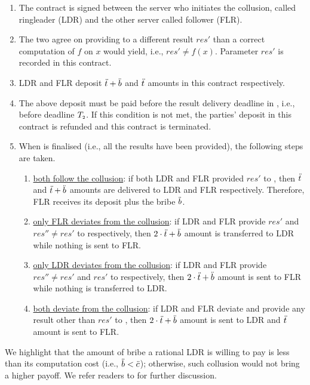 \begin{enumerate}
%
\item The contract is signed between the server who initiates the collusion, called ringleader (LDR) and the other server called follower (FLR). 
%
\item The two agree on providing to \SCpc a different result $res'$ than a correct computation of $f$ on $x$ would yield, i.e., $res'\neq f(x)$. Parameter $res'$ is recorded in this contract. 
%
\item LDR and FLR deposit $\ddot{t}+\ddot{b}$ and $\ddot{t}$ amounts in this contract respectively. 
%
\item The above deposit must be paid before the result delivery deadline in \SCpc, i.e., before deadline $T_{\scriptscriptstyle 2}$. If this condition is not met, the parties' deposit in this contract is refunded and this contract is terminated. 
%
\item When \SCpc is finalised (i.e., all the results have been provided), the following steps are taken.
%
\begin{enumerate}
%
\item \underline{both follow the collusion}: if both LDR and FLR provided $res'$ to \SCpc, then $\ddot{t}$ and $\ddot{t}+\ddot{b}$ amounts are delivered to LDR and FLR respectively. Therefore, FLR receives its deposit plus the bribe $\ddot{b}$. 
%
\item \underline{only FLR deviates from the collusion}:  if LDR and FLR provide $res'$ and $res''\neq res'$ to \SCpc respectively, then $2\cdot \ddot{t}+\ddot{b}$ amount is transferred to LDR while nothing is sent to FLR. 
%
\item \underline{only LDR deviates from the collusion}: if LDR and FLR provide $res''\neq res'$ and $res'$ to \SCpc respectively, then $2\cdot \ddot{t}+\ddot{b}$ amount is sent to FLR while nothing is transferred to LDR.  
%
\item \underline{both deviate from the collusion}: if LDR and FLR deviate and provide any result other than $res'$ to \SCpc, then  $2\cdot \ddot{t}+\ddot{b}$ amount is sent to LDR and $\ddot{t}$ amount is sent to FLR. 
%
\end{enumerate}
%
\end{enumerate}

We highlight that the amount of bribe a rational LDR is willing to pay is less than its computation cost (i.e., $\ddot{b}<\ddot{c}$); otherwise, such collusion would not bring a higher payoff. We refer readers to \cite{dong2017betrayal} for further discussion. 






















